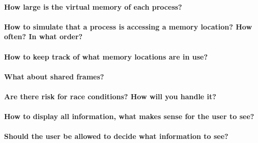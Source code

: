 \hypertarget{how-large-is-the-virtual-memory-of-each-process}{%
\paragraph{How large is the virtual memory of each
process?}\label{how-large-is-the-virtual-memory-of-each-process}}

\hypertarget{how-to-simulate-that-a-process-is-accessing-a-memory-location-how-often-in-what-order}{%
\paragraph{How to simulate that a process is accessing a memory
location? How often? In what
order?}\label{how-to-simulate-that-a-process-is-accessing-a-memory-location-how-often-in-what-order}}

\hypertarget{how-to-keep-track-of-what-memory-locations-are-in-use}{%
\paragraph{How to keep track of what memory locations are in
use?}\label{how-to-keep-track-of-what-memory-locations-are-in-use}}

\hypertarget{what-about-shared-frames}{%
\paragraph{What about shared frames?}\label{what-about-shared-frames}}

\hypertarget{are-there-risk-for-race-conditions-how-will-you-handle-it}{%
\paragraph{Are there risk for race conditions? How will you handle
it?}\label{are-there-risk-for-race-conditions-how-will-you-handle-it}}

\hypertarget{how-to-display-all-information-what-makes-sense-for-the-user-to-see}{%
\paragraph{How to display all information, what makes sense for the user
to
see?}\label{how-to-display-all-information-what-makes-sense-for-the-user-to-see}}

\hypertarget{should-the-user-be-allowed-to-decide-what-information-to-see}{%
\paragraph{Should the user be allowed to decide what information to
see?}\label{should-the-user-be-allowed-to-decide-what-information-to-see}}

